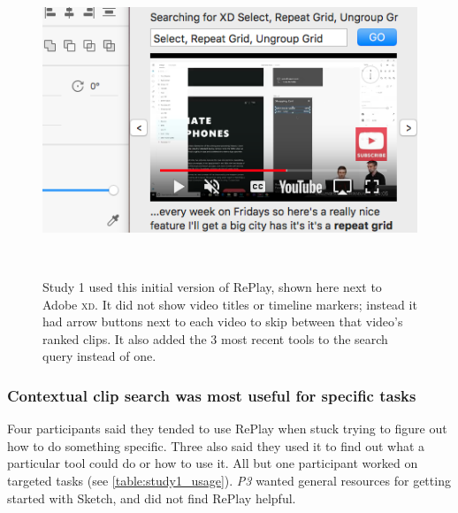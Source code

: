 \begin{figure}[t!]
\centering
  \includegraphics[width=\textwidth]{replay/figures/replay-old.png}
  \caption{Study 1 used this initial version of RePlay, shown here next to Adobe \textsc{xd}. It did not show video titles or timeline markers; instead it had arrow buttons next to each video to skip between that video's ranked clips. It also added the 3 most recent tools to the search query instead of one. }~\label{fig:replay-old}
\vspace{-0.25in}
\end{figure}

\subsubsection{Contextual clip search was most useful for specific tasks}
Four participants said they tended to use RePlay when stuck trying to figure out how to do something specific. Three also said they used it to find out what a particular tool could do or how to use it. All but one participant worked on targeted tasks (see \autoref{table:study1_usage}). \textit{P3} wanted general resources for getting started with Sketch, and did not find RePlay helpful.

